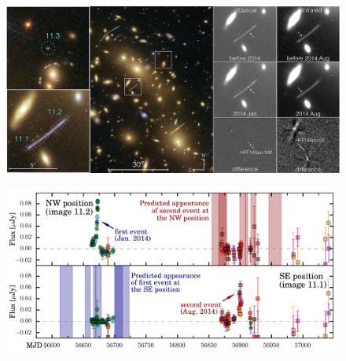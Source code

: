 
\begin{figure}[tbp]
\begin{center}
\includegraphics[width=1\textwidth]{detection_image.png}
\caption{ \protect}
\end{center}
\end{figure}



\begin{figure}[tbp]
  \begin{center}
    \includegraphics[width=\textwidth]{spock_predictions.png}
    \caption{\protect}
  \end{center}
\end{figure}


